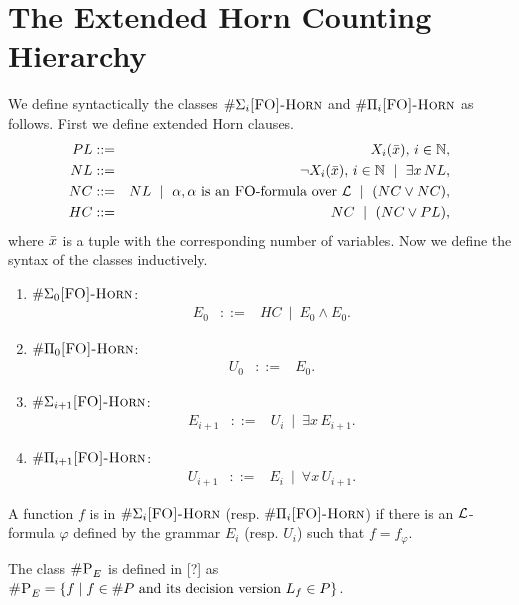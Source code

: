 \section{The Extended Horn Counting Hierarchy}

We define syntactically the classes $\#\Sigma_{i}\textsc{[FO]-Horn}$ and $\#\Pi_{i}\textsc{[FO]-Horn}$ as follows. First we define extended Horn clauses.
\begin{eqnarray*}
PL &::=& X_i(\bar{x}),\, i\in\mathbb{N},\\
NL &::=& \neg X_i(\bar{x}),\, i\in\mathbb{N} \ \mid \ \exists x\, NL,\\
NC &::=& NL \ \mid \ \alpha, \alpha \mbox{ is an {\sc FO}-formula over } {\cal L} \ \mid \ (NC \vee NC),\\
HC &::=& NC \ \mid \ (NC \vee PL),
\end{eqnarray*}
where $\bar{x}$ is a tuple with the corresponding number of variables. Now we define the syntax of the classes inductively.
\begin{enumerate}
	\item $\#\Sigma_0\textsc{[FO]-Horn}$:
	\begin{eqnarray*}
	E_0 &::=& HC \ \mid \ E_0 \wedge E_0.
	\end{eqnarray*}
	\item $\#\Pi_0\textsc{[FO]-Horn}$:
	\begin{eqnarray*}
	U_0 &::=& E_0.
	\end{eqnarray*}
	\item $\#\Sigma_{i+1}\textsc{[FO]-Horn}$:
	\begin{eqnarray*}
	E_{i+1} &::=& U_i \ \mid \ \exists x \, E_{i+1}.
	\end{eqnarray*}
	\item $\#\Pi_{i+1}\textsc{[FO]-Horn}$:
	\begin{eqnarray*}
		U_{i+1} &::=& E_i \ \mid \ \forall x \, U_{i+1}.
	\end{eqnarray*}
\end{enumerate}
A function $f$ is in $\#\Sigma_{i}\textsc{[FO]-Horn}$ (resp. $\#\Pi_{i}\textsc{[FO]-Horn}$) if there is an ${\cal L}$-formula $\varphi$ defined by the grammar $E_i$ (resp. $U_i$) such that $f = f_{\varphi}$.

The class $\textsc{\#P}_E$ is defined in [?] as $\textsc{\#P}_E = \{f\mid f\in\#P \mbox{ and its decision version } L_{f}\in P\}$.

